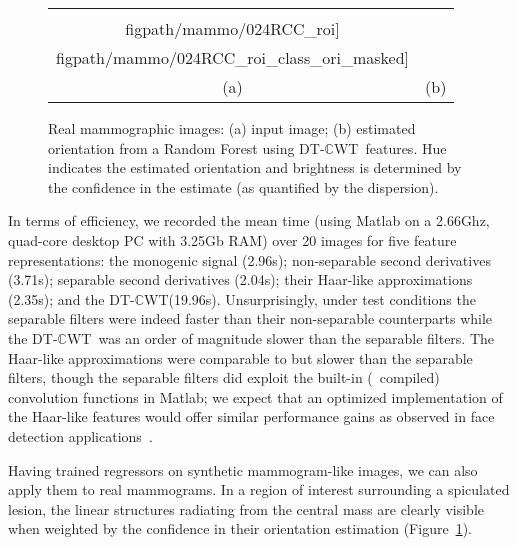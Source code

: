 \documentclass[10pt,twocolumn,letterpaper]{article}
\newcommand{\fref}[1]{Figure~\ref{#1}}
\def\dtcwt{DT-$\mathbb{C}$WT}
\begin{document}
\begin{figure}[t]
\centering
\begin{tabular}{c c}
\texttt{[image: \\figpath/mammo/024RCC\_roi]} &
\texttt{[image: \\figpath/mammo/024RCC\_roi\_class\_ori\_masked]} \\
(a) & (b) \\
\end{tabular}
%
\caption{Real mammographic images: %
(a) input image; %
(b) estimated orientation from a Random Forest using \dtcwt~features. Hue indicates the estimated orientation and brightness is determined by the confidence in the estimate (as quantified by the dispersion).}
\label{f:real_mammography}
\end{figure}

In terms of efficiency, we recorded the mean time (using Matlab on a 2.66Ghz, quad-core desktop PC with 3.25Gb RAM) over 20 images for five feature representations: the monogenic signal (2.96s); non-separable second derivatives (3.71s); separable second derivatives (2.04s); their Haar-like approximations (2.35s); and the \dtcwt (19.96s). Unsurprisingly, under test conditions the separable filters were indeed faster than their non-separable counterparts while the \dtcwt~was an order of magnitude slower than the separable filters. The Haar-like approximations were comparable to but slower than the separable filters, though the separable filters did exploit the built-in (\ie~compiled) convolution functions in Matlab; we expect that an optimized implementation of the Haar-like features would offer similar performance gains as observed in face detection applications~\cite{Viola_Jones_IJCV04}.

Having trained regressors on synthetic mammogram-like images, we can also apply them to real mammograms. In a region of interest surrounding a spiculated lesion, the linear structures radiating from the central mass are clearly visible when weighted by the confidence in their orientation estimation (\fref{f:real_mammography}).
\end{document}
